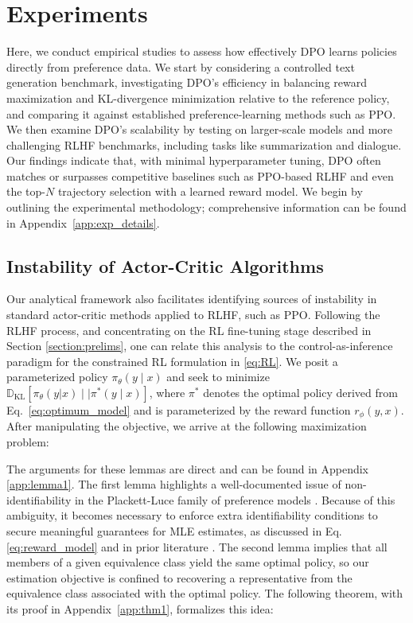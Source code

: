 \label{sec:theory}

\section{Experiments}
Here, we conduct empirical studies to assess how effectively DPO learns policies directly from preference data. We start by considering a controlled text generation benchmark, investigating DPO’s efficiency in balancing reward maximization and KL-divergence minimization relative to the reference policy, and comparing it against established preference-learning methods such as PPO. We then examine DPO’s scalability by testing on larger-scale models and more challenging RLHF benchmarks, including tasks like summarization and dialogue. Our findings indicate that, with minimal hyperparameter tuning, DPO often matches or surpasses competitive baselines such as PPO-based RLHF and even the top-$N$ trajectory selection with a learned reward model. We begin by outlining the experimental methodology; comprehensive information can be found in Appendix~\ref{app:exp_details}.

\subsection{Instability of Actor-Critic Algorithms} Our analytical framework also facilitates identifying sources of instability in standard actor-critic methods applied to RLHF, such as PPO. Following the RLHF process, and concentrating on the RL fine-tuning stage described in Section \ref{section:prelims}, one can relate this analysis to the control-as-inference paradigm \cite{levine2018reinforcement} for the constrained RL formulation in \ref{eq:RL}. We posit a parameterized policy $\pi_{\theta}(y\mid x)$ and seek to minimize $\mathbb{D}_{\text{KL}}[\pi_{\theta}(y|x) \mid \mid \pi^*(y\mid x)]$, where $\pi^*$ denotes the optimal policy derived from Eq.~\ref{eq:optimum_model} and is parameterized by the reward function $r_{\phi}(y, x)$. After manipulating the objective, we arrive at the following maximization problem:

The arguments for these lemmas are direct and can be found in Appendix \ref{app:lemma1}. The first lemma highlights a well-documented issue of non-identifiability in the Plackett-Luce family of preference models \cite{plackett1975analysis}. Because of this ambiguity, it becomes necessary to enforce extra identifiability conditions to secure meaningful guarantees for MLE estimates, as discussed in Eq. \ref{eq:reward_model} and in prior literature \cite{bong2022generalized}. The second lemma implies that all members of a given equivalence class yield the same optimal policy, so our estimation objective is confined to recovering a representative from the equivalence class associated with the optimal policy. The following theorem, with its proof in Appendix~\ref{app:thm1}, formalizes this idea:

